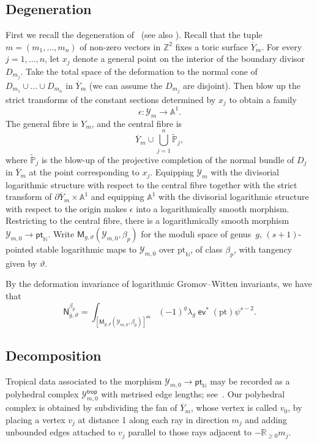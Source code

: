\documentclass[11pt]{amsart}
\numberwithin{equation}{section}
\theoremstyle{plain}
\theoremstyle{remark}
\theoremstyle{definition}
\DeclareMathOperator{\ev}{\mathsf{ev}}
\newcommand{\cY}{\mathcal{Y}}
\newcommand{\NN}{\mathbb{N}}
\newcommand{\PP}{\mathbb{P}}
\newcommand{\RR}{\mathbb{R}}
\newcommand{\ZZ}{\mathbb{Z}}
\newcommand{\AAA}{\mathbb{A}}
\begin{document}
\subsection{Degeneration}

First we recall the degeneration of~\cite[Section 5.3]{gross2010vertex} (see also \cite{bousseau2020quantumtrop,mandel2021theta}). Recall that the tuple $m= (m_1, \dots,m_n)$ of non-zero vectors in $\ZZ^2$ fixes a toric surface $\overline{Y}_m$. For every $j=1,\dots,n$, let $x_j$ denote a general point on the interior of the boundary divisor $D_{m_j}$. Take the total space of the deformation to the normal cone of $D_{m_1} \cup \dots \cup D_{m_n}$ in $\overline{Y}_m$ (we can assume the $D_{m_j}$ are disjoint). Then blow up the strict transforms of the constant sections determined by $x_j$ to obtain a family
$$\epsilon \colon \cY_m \longrightarrow \AAA^1.$$
The general fibre is $Y_m$, and the central fibre is $$\overline{Y}_m \cup \bigcup_{j=1}^n \tilde{\PP}_{j},$$ where $\tilde{\PP}_j$ is the blow-up of the projective completion of the normal bundle of $D_j$ in $\overline{Y}_m$ at the point corresponding to $x_j$. Equipping $\cY_m$ with the divisorial logarithmic structure with respect to the central fibre together with the strict transform of $\partial \overline{Y}_m \times \AAA^1$ and equipping $\AAA^1$ with the divisorial logarithmic structure with respect to the origin makes $\epsilon$ into a logarithmically smooth morphism. Restricting to the central fibre, there is a logarithmically smooth morphism $\cY_{m,0} \rightarrow \mathsf{pt}_{\NN}$. Write $\mathsf{M}_{g,\vartheta}(\cY_{m,0},\beta_p)$ for the moduli space of genus~$g$, $(s+1)$-pointed stable logarithmic maps to $\cY_{m,0}$ over $\mathrm{pt}_{\NN}$, of class $\beta_p$, with tangency given by $\vartheta$.

By the deformation invariance of logarithmic Gromov--Witten invariants, we have that $$\mathsf{N}_{g,\vartheta}^{\beta_p} = \int_{\left[\mathsf{M}_{g,\vartheta}(\mathcal{Y}_{m,0},\beta_p)\right]^\mathsf{vir}}(-1)^g\lambda_g \ev^* (\mathrm{pt}) \psi^{s-2}.$$

\subsection{Decomposition}

Tropical data associated to the morphism $\cY_{m,0} \rightarrow \mathsf{pt}_{\NN}$ may be recorded as a polyhedral complex $\cY^{\mathsf{trop}}_{m,0}$ with metrised edge lengths; see~\cite[Section 5.3]{bousseau2020quantumtrop}. Our polyhedral complex is obtained by subdividing the fan of $\overline{Y}_m$, whose vertex is called $v_0$, by placing a vertex $v_j$ at distance 1 along each ray in direction $m_j$ and adding unbounded edges attached to $v_j$ parallel to those rays adjacent to $-\RR_{\geq 0}m_{j}$.
\end{document}
